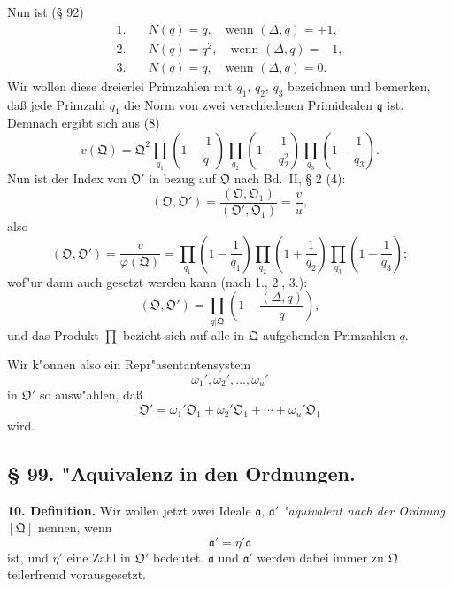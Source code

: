 \documentclass[12pt,a4paper]{article}
\theoremstyle{plain}
\begin{document}
Nun ist (\S{} 92)
\begin{align*}
\text{1.}\quad & N(q) = q,\quad \text{wenn } (\Delta, q) = +1,\\
\text{2.}\quad & N(q) = q^2,\quad \text{wenn } (\Delta, q) = -1,\\
\text{3.}\quad & N(q) = q,\quad \text{wenn } (\Delta, q) = 0.
\end{align*}
Wir wollen diese dreierlei Primzahlen mit $q_1$, $q_2$, $q_3$ bezeichnen und bemerken, da\ss{} jede Primzahl $q_1$ die Norm von zwei verschiedenen Primidealen $\mathfrak{q}$ ist. Demnach ergibt sich aus (8)
\begin{equation}
v(\mathfrak{Q}) = \mathfrak{Q}^2 \prod_{q_1}\left(1 - \frac{1}{q_1}\right) \prod_{q_2}\left(1 - \frac{1}{q_2^2}\right) \prod_{q_3}\left(1 - \frac{1}{q_3}\right).
\tag{9}
\end{equation}
Nun ist der Index von $\mathfrak{O}'$ in bezug auf $\mathfrak{O}$ nach Bd.~II, \S{} 2 (4):
\[
(\mathfrak{O}, \mathfrak{O}') = \frac{(\mathfrak{O}, \mathfrak{O}_1)}{(\mathfrak{O}', \mathfrak{O}_1)} = \frac{v}{u},
\]
also
\begin{equation}
(\mathfrak{O}, \mathfrak{O}') = \frac{v}{\varphi(\mathfrak{Q})} = \prod_{q_1}\left(1 - \frac{1}{q_1}\right) \prod_{q_2}\left(1 + \frac{1}{q_2}\right) \prod_{q_3}\left(1 - \frac{1}{q_3}\right);
\tag{10}
\end{equation}
wof"ur dann auch gesetzt werden kann (nach 1., 2., 3.):
\begin{equation}
(\mathfrak{O}, \mathfrak{O}') = \prod_{q|\mathfrak{Q}}\left(1 - \frac{(\Delta, q)}{q}\right),
\tag{10}
\end{equation}
und das Produkt $\prod$ bezieht sich auf alle in $\mathfrak{Q}$ aufgehenden Primzahlen $q$.

Wir k"onnen also ein Repr"asentantensystem
\[
\omega_1', \omega_2', \ldots, \omega_u'
\]
in $\mathfrak{O}'$ so ausw"ahlen, da\ss{}
\begin{equation}
\mathfrak{O}' = \omega_1'\mathfrak{O}_1 + \omega_2'\mathfrak{O}_1 + \cdots + \omega_u'\mathfrak{O}_1
\end{equation}
wird.

\subsection*{\S{} 99. "Aquivalenz in den Ordnungen.}

\textbf{10. Definition.} Wir wollen jetzt zwei Ideale $\mathfrak{a}$, $\mathfrak{a}'$ \textit{"aquivalent nach der Ordnung $[\mathfrak{Q}]$} nennen, wenn
\begin{equation}
\mathfrak{a}' = \eta'\mathfrak{a}
\tag{1}
\end{equation}
ist, und $\eta'$ eine Zahl in $\mathfrak{O}'$ bedeutet. $\mathfrak{a}$ und $\mathfrak{a}'$ werden dabei immer zu $\mathfrak{Q}$ teilerfremd vorausgesetzt.
\end{document}
